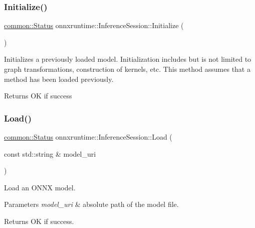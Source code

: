 \subsubsection{\texorpdfstring{Initialize()}{Initialize()}}
{\footnotesize\ttfamily \mbox{\hyperlink{classonnxruntime_1_1common_1_1Status}{common\+::\+Status}} onnxruntime\+::\+Inference\+Session\+::\+Initialize (\begin{DoxyParamCaption}{ }\end{DoxyParamCaption})}

Initializes a previously loaded model. Initialization includes but is not limited to graph transformations, construction of kernels, etc. This method assumes that a method has been loaded previously. \begin{DoxyReturn}{Returns}
OK if success 
\end{DoxyReturn}
\mbox{\label{classonnxruntime_1_1InferenceSession_a2cba03dfe0b8399e2d366bdcef2c9dc9}} 
\subsubsection{\texorpdfstring{Load()}{Load()}\hspace{0.1cm}{\footnotesize\ttfamily [1/4]}}
{\footnotesize\ttfamily \mbox{\hyperlink{classonnxruntime_1_1common_1_1Status}{common\+::\+Status}} onnxruntime\+::\+Inference\+Session\+::\+Load (\begin{DoxyParamCaption}\item[{const std\+::string \&}]{model\+\_\+uri }\end{DoxyParamCaption})}

Load an O\+N\+NX model. 
\begin{DoxyParams}{Parameters}
{\em model\+\_\+uri} & absolute path of the model file. \\
\hline
\end{DoxyParams}
\begin{DoxyReturn}{Returns}
OK if success. 
\end{DoxyReturn}
\mbox{\label{classonnxruntime_1_1InferenceSession_adc261dabbe5b1e346736b35394272081}} 
